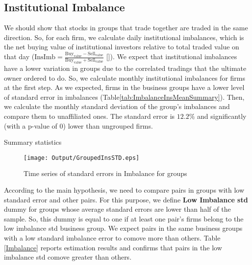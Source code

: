\FloatBarrier

%
%
\subsection{{Institutional Imbalance}}

	We should show that stocks in groups that trade together are traded in the same direction. So, for each firm, we calculate daily institutional imbalances, which is the net buying value of institutional investors relative to total traded value on that day ($ \text{InsImb} = \frac{\text{Buy}_{\text{value}} - \text{Sell}_{\text{value}}}{\text{Buy}_{\text{value}} + \text{Sell}_{\text{value}}} $ [\cite{seasholes2007predictable}]).
		We expect that institutional imbalances have a lower variation in groups due to the correlated tradings that the ultimate owner ordered to do. So, we calculate monthly institutional imbalances for firms at the first step. As we expected, firms in the business groups have a lower level of standard error in  imbalances (Table\ref{tab:ImbalanceInsMeanSummary}). Then, we calculate the monthly standard deviation of the group's imbalances and compare them to unaffiliated ones. The standard error is  $12.2\%$ and significantly (with a p-value of 0) lower than ungrouped firms. 
		
	{\begin{table}[htbp]
	\caption{Summary statistics}
		\centering
			\label{tab:ImbalanceInsMeanSummary}%
		\resizebox{0.75\textwidth}{!}{
			
		}
	

				\label{tab:ImbalanceInsStdSummary}%
		\resizebox{0.75\textwidth}{!}{
			
		}
\end{table}}
	\begin{figure}[htbp]
		\centering
		\texttt{[image: Output/GroupedInsSTD.eps]}
				\caption{Time series of standard errors in Imbalance for groups}
		\label{fig:GroupedInsSTD}
	\end{figure}
	
	According to the main hypothesis, we need to compare pairs in groups with low standard error and other pairs. For this purpose, we define \textbf{Low Imbalance std} dummy for groups whose average standard errors are lower than half of the sample. So, this dummy is equal to one if at least one pair's firms belong to the low imbalance std business group. We expect pairs in the same business groups with a low standard imbalance error to comove more than others. Table \ref{Imbalance} reports estimation results and confirms that pairs in the low imbalance std comove greater than others. 
	
%				



\FloatBarrier

